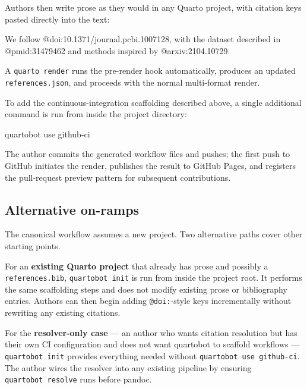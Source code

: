 \documentclass[
  letterpaper,
  DIV=11,
  numbers=noendperiod]{scrartcl}
\newenvironment{Shaded}{\begin{snugshade}}{\end{snugshade}}
\newcommand{\ExtensionTok}[1]{\textcolor[rgb]{0.00,0.23,0.31}{#1}}
\newcommand{\NormalTok}[1]{\textcolor[rgb]{0.00,0.23,0.31}{#1}}
\begin{document}
Authors then write prose as they would in any Quarto project, with
citation keys pasted directly into the text:

\begin{Shaded}
\begin{Highlighting}[]
\NormalTok{We follow @doi:10.1371/journal.pcbi.1007128, with the dataset described}
\NormalTok{in @pmid:31479462 and methods inspired by @arxiv:2104.10729.}
\end{Highlighting}
\end{Shaded}

A \texttt{quarto\ render} runs the pre-render hook automatically,
produces an updated \texttt{references.json}, and proceeds with the
normal multi-format render.

To add the continuous-integration scaffolding described above, a single
additional command is run from inside the project directory:

\begin{Shaded}
\begin{Highlighting}[]
\ExtensionTok{quartobot}\NormalTok{ use github{-}ci}
\end{Highlighting}
\end{Shaded}

The author commits the generated workflow files and pushes; the first
push to GitHub initiates the render, publishes the result to GitHub
Pages, and registers the pull-request preview pattern for subsequent
contributions.

\subsection{Alternative on-ramps}\label{alternative-on-ramps}

The canonical workflow assumes a new project. Two alternative paths
cover other starting points.

For an \textbf{existing Quarto project} that already has prose and
possibly a \texttt{references.bib}, \texttt{quartobot\ init} is run from
inside the project root. It performs the same scaffolding steps and does
not modify existing prose or bibliography entries. Authors can then
begin adding \texttt{@doi:}-style keys incrementally without rewriting
any existing citations.

For the \textbf{resolver-only case} --- an author who wants citation
resolution but has their own CI configuration and does not want
quartobot to scaffold workflows --- \texttt{quartobot\ init} provides
everything needed without \texttt{quartobot\ use\ github-ci}. The author
wires the resolver into any existing pipeline by ensuring
\texttt{quartobot\ resolve} runs before pandoc.
\end{document}
